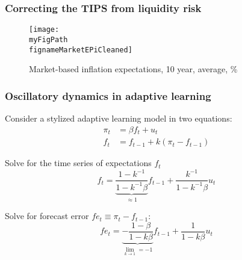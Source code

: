 \documentclass[10pt]{beamer}
\def \myFigPath {../../../figures/}
\def\fignameMarketEPiCleaned{cleaned_epi10_2020_07_28}
\begin{document}
\begin{frame}[plain]  %
\frametitle{Correcting the TIPS from liquidity risk}
	\label{app_TIPS}

\begin{figure}[h!]
\texttt{[image: \\myFigPath \\fignameMarketEPiCleaned]} %
\caption{Market-based inflation expectations, 10 year, average, \%}
\label{epi_cleaned}
\end{figure}

\vfill 
\hyperlink{motivation}{}	

\end{frame}

\begin{frame}[plain]  %
\frametitle{Oscillatory dynamics in adaptive learning}
	\label{oscillatory}

Consider a stylized adaptive learning model in two equations:
\begin{align}
\pi_t & = \beta f_t + u_t  \\
f_t & = f_{t-1} + k(\pi_t - f_{t-1}) 
\end{align}

Solve for the time series of expectations $f_t$
\begin{equation}
f_t = \underbrace{\frac{1-k^{-1}}{1-k^{-1}\beta}}_{\approx 1}f_{t-1} + \frac{k^{-1}}{1-k^{-1}\beta}u_t
\end{equation}

Solve for forecast error $fe_t \equiv \pi_t - f_{t-1}$:
\begin{equation}
fe_t = \underbrace{-\frac{1-\beta}{1-k\beta}}_{\lim_{k \to 1} = -1}f_{t-1} + \frac{1}{1-k\beta}u_t 
\end{equation}

\end{frame}
\end{document}
